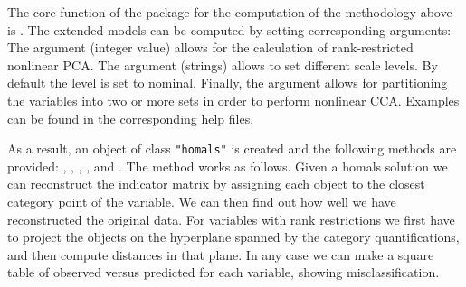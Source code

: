 \documentclass[article]{jss1}
\begin{document}
The core function of the package for the computation of the methodology above is . The extended models can be computed by setting corresponding arguments: The  argument (integer value) allows for the calculation of rank-restricted nonlinear PCA. The  argument (strings) allows to set different scale levels. By default the level is set to nominal. Finally, the  argument allows for partitioning the variables into two or more sets in order to perform nonlinear CCA. Examples can be found in the corresponding help files. 

As a result, an object of class \texttt{"homals"} is created and the following methods are provided: , , , ,  and . The  method works as follows. Given a homals solution we can reconstruct the indicator matrix by assigning each object to the closest category point of the variable. We can then find out how well we have reconstructed the original data. For variables with rank restrictions we first have to project the objects on the hyperplane spanned by the category quantifications, and then compute distances in that plane. In any case we can make a square table of observed versus predicted for each variable, showing misclassification. 
\end{document}
